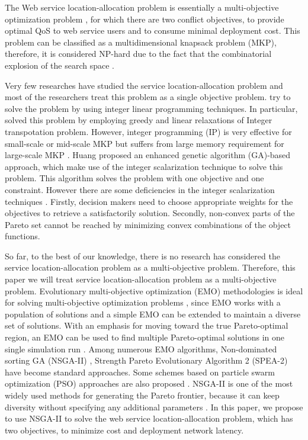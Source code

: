 \documentclass{llncs}
\begin{document}
The Web service location-allocation problem is essentially a multi-objective optimization problem \cite{Multiobjective}, for which there are two conflict objectives,
to provide optimal QoS to web service users and to consume minimal deployment cost.
This problem can be classified as a multidimensional knapsack problem (MKP), therefore, it is
considered NP-hard due to the fact that the combinatorial explosion of the search space 
\cite{Vanrompay}.


Very few researches have studied the service location-allocation problem and most of the researchers treat this problem as a single objective problem.
\cite{Aboolian} \cite{Sun} try to solve the problem by using integer linear programming techniques.
In particular, \cite{Sun} solved this problem by employing greedy and linear relaxations of Integer transpotation problem.
However, integer programming (IP) is very effective for small-scale or mid-scale 
MKP but suffers from large memory requirement for large-scale MKP \cite{Hwang11aninteger}.
Huang \cite{EnhancedGenetic} proposed an enhanced genetic algorithm (GA)-based approach, which make use of the integer scalarization technique to solve this problem.
This algorithm solves the problem with one objective and one constraint. However there are some deficiencies in the
integer scalarization techniques \cite{Multiobjective}. Firstly, decision makers need to choose appropriate weights for the objectives to retrieve a satisfactorily solution. 
Secondly, non-convex parts of the Pareto set cannot be reached by minimizing convex combinations of the object functions.


So far, to the best of our knowledge, there is no research has considered the service location-allocation problem as a multi-objective problem. Therefore, this paper we will treat service location-allocation problem as a multi-objective problem. Evolutionary multi-objective optimization (EMO) methodologies
 is ideal for solving multi-objective optimization problems \cite{key:article}, since EMO works with a population of solutions and 
a simple EMO can be extended to maintain a diverse set of solutions.
With an emphasis for moving toward the true Pareto-optimal region, an EMO can be used to find multiple Pareto-optimal solutions in 
one single simulation run \cite{OptimizationElectrical}. Among numerous EMO algorithms,
Non-dominated sorting GA (NSGA-II) \cite{996017}, Strength Pareto Evolutionary Algorithm 2 (SPEA-2) \cite{Deb} have become standard approaches. 
Some schemes based on particle swarm optimization (PSO) approaches are also proposed \cite{Elhossini} \cite{Huang}.
NSGA-II is one of the most widely used methods for generating the Pareto frontier, because it can keep diversity without specifying any additional parameters \cite{Deb06referencepoint}.
In this paper, we propose to use NSGA-II to solve the web service 
location-allocation problem, which has two objectives, to minimize
cost and deployment network latency.
\end{document}
